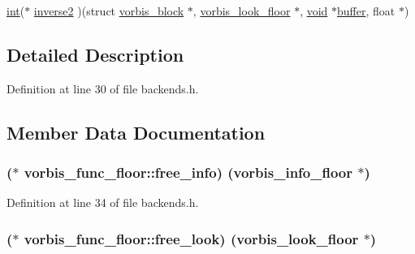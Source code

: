 \begin{DoxyCompactItemize}
\item 
\hyperlink{xmltok_8h_a5a0d4a5641ce434f1d23533f2b2e6653}{int}($\ast$ \hyperlink{structvorbis__func__floor_aabcd133bf6e6bd74664012cfd52c072c}{inverse2} )(struct \hyperlink{structvorbis__block}{vorbis\+\_\+block} $\ast$, \hyperlink{codec__internal_8h_af4cb27874fc2abb2b43a025d7a3c900a}{vorbis\+\_\+look\+\_\+floor} $\ast$, \hyperlink{sound_8c_ae35f5844602719cf66324f4de2a658b3}{void} $\ast$\hyperlink{structbuffer}{buffer}, float $\ast$)
\end{DoxyCompactItemize}


\subsection{Detailed Description}


Definition at line 30 of file backends.\+h.



\subsection{Member Data Documentation}
\subsubsection[{\texorpdfstring{free\+\_\+info}{free_info}}]{($\ast$ vorbis\+\_\+func\+\_\+floor\+::free\+\_\+info) ({\bf vorbis\+\_\+info\+\_\+floor} $\ast$)}\hypertarget{structvorbis__func__floor_acca582708a740c0506abbdb3e7620efe}{}\label{structvorbis__func__floor_acca582708a740c0506abbdb3e7620efe}


Definition at line 34 of file backends.\+h.

\subsubsection[{\texorpdfstring{free\+\_\+look}{free_look}}]{($\ast$ vorbis\+\_\+func\+\_\+floor\+::free\+\_\+look) ({\bf vorbis\+\_\+look\+\_\+floor} $\ast$)}\hypertarget{structvorbis__func__floor_abfd539a69106124b020eeb839337dd13}{}\label{structvorbis__func__floor_abfd539a69106124b020eeb839337dd13}


